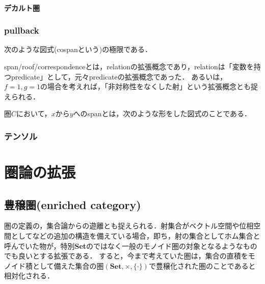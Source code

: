 \documentclass[uplatex, dvipdfmx]{jsreport}
\begin{document}
\subsection{デカルト圏}

\section{pullback}

\begin{definition}[pullbackの普遍性]\rm{}
    次のような図式(cospanという)の極限である．
    \begin{center}\end{center}
\end{definition}

span/roof/correspondenceとは，relationの拡張概念であり，relationは「変数を持つpredicate」として，元々predicateの拡張概念であった．
あるいは，$f=1,g=1$の場合を考えれば，「非対称性をなくした射」という拡張概念とも捉えられる．
\begin{definition}\rm{}
    圏$C$において，$x$から$y$へのspanとは，次のような形をした図式のことである．
    \begin{center}\end{center}
\end{definition}

\section{テンソル}




\part{圏論の拡張}

\chapter{豊穣圏(enriched category)}
圏の定義の，集合論からの遊離とも捉えられる．射集合がベクトル空間や位相空間としてなどの追加の構造を備えている場合，即ち，射の集合としてホム集合と呼んでいた物が，特別\textbf{Set}のではなく一般のモノイド圏の対象となるようなものでも良いとする拡張である．
すると，今まで考えていた圏は，集合の直積をモノイド積として備えた集合の圏$(\mathbf{Set},\times,\{\cdot\} )$で豊穣化された圏のことであると相対化される．
\end{document}
